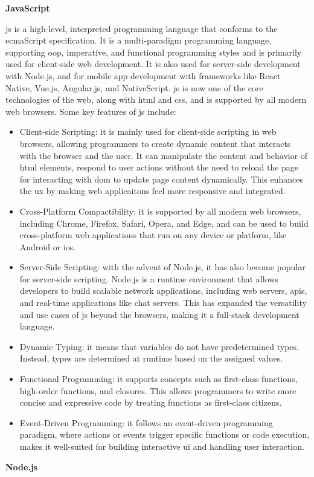 \begin{multicols}{2}
      \textbf{JavaScript}

      \acrshort{js} is a high-level, interpreted programming language that conforms to the \acrshort{ecma}Script specification.
      It is a multi-paradigm programming language, supporting \acrshort{oop}, imperative, and functional programming styles and
      is primarily used for client-side web development. It is also used for server-side development with Node.js, and for
      mobile app development with frameworks like React Native, Vue.js, Angular.js, and NativeScript. \acrshort{js} is now one
      of the core technologies of the web, along with \acrshort{html} and \acrshort{css}, and is supported by all modern web
      browsers. Some key features of \acrshort{js} include:
      \begin{itemize}
            \item Client-side Scripting: it is mainly used for client-side scripting in web browsers, allowing programmers to
                  create dynamic content that interacts with the browser and the user. It can manipulate the content and behavior
                  of \acrshort{html} elements, respond to user actions without the need to reload the page for interacting with
                  \acrshort{dom} to update page content dynamically. This enhances the \acrshort{ux} by making web applicaitons
                  feel more responsive and integrated.
            \item Cross-Platform Compactibility: it is supported by all modern web browsers, including Chrome, Firefox, Safari,
                  Opera, and Edge, and can be used to build cross-platform web applications that run on any device or platform,
                  like Android or i\acrshort{os}.
            \item Server-Side Scripting: with the advent of Node.js, it has also become popular for server-side scripting. Node.js
                  is a runtime environment that allows developers to build scalable network applications, including web servers,
                  \acrshort{api}s, and real-time applications like chat servers. This has expanded the versatility and use cases of
                  \acrshort{js} beyond the browsers, making it a full-stack development language.
            \item Dynamic Typing: it means that variables do not have predetermined types. Instead, types are determined at runtime
                  based on the assigned values.
            \item Functional Programming: it supports concepts such as first-class functions, high-order functions, and closures.
                  This allows programmers to write more concise and expressive code by treating functions as first-class citizens.
            \item Event-Driven Programming: it follows an event-driven programming paradigm, where actions or events trigger specific
                  functions or code execution, makes it well-suited for building interactive \acrshort{ui} and handling user interaction.
      \end{itemize}
      \textbf{Node.js}


\end{multicols}

